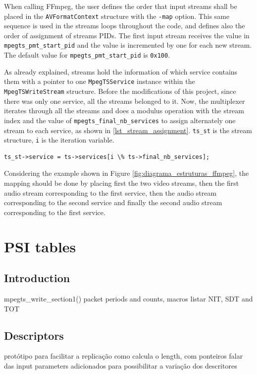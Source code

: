 \documentclass[
	12pt,				%
	openright,			%
	twoside,			%
	a4paper,			%
	brazil,
	french,				%
	english
	]{abntex2}
\begin{document}
When calling FFmpeg, the user defines the order that input streams shall be placed in the \texttt{AVFormatContext} structure with the \texttt{-map} option. This same sequence is used in the streams loops throughout the code, and defines also the order of assignment of streams PIDs. The first input stream receives the value in \texttt{mpegts\_pmt\_start\_pid} and the value is incremented by one for each new stream. The default value for \texttt{mpegts\_pmt\_start\_pid} is \texttt{0x100}.

As already explained, streams hold the information of which service contains them with a pointer to one \texttt{MpegTSService} instance within the \texttt{MpegTSWriteStream} structure. Before the modifications of this project, since there was only one service, all the streams belonged to it. Now, the multiplexer iterates through all the streams and does a modulus operation with the stream index and the value of \texttt{mpegts\_final\_nb\_services} to assign alternately one stream to each service, as shown in \autoref{lst_stream_assignment}. \texttt{ts\_st} is the stream structure, \texttt{i} is the iteration variable.

\begin{lstlisting}[caption={Assigning streams to services.}, label=[lst_stream_assignment]
ts_st->service = ts->services[i \% ts->final_nb_services];
\end{lstlisting}

Considering the example shown in Figure \ref{fig:diagrama_estruturas_ffmpeg}, the mapping should be done by placing first the two video streams, then the first audio stream corresponding to the first service, then the audio stream corresponding to the second service and finally the second audio stream corresponding to the first service.

\section{PSI tables}

\subsection{Introduction}
mpegts\_write\_section1()
packet periods and counts, macros
listar NIT, SDT and TOT

\subsection{Descriptors}
protótipo para facilitar a replicação
como calcula o length, com ponteiros
falar das input parameters adicionados para possibilitar a variação dos descritores
\end{document}
